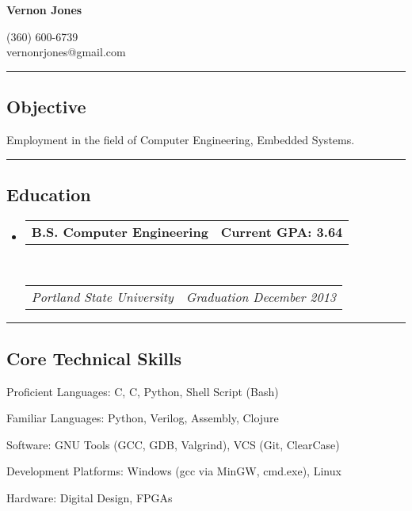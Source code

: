 \documentclass[10pt,letterpaper]{article}
\makeatletter
\newenvironment{indentsection}[1]%
{\begin{list}{}%
	{\setlength{\leftmargin}{#1}}%
	\item[]%
}
{\end{list}}
\newcommand{\headerrow}[2]
{\begin{tabular*}{\linewidth}{l@{\extracolsep{\fill}}r}
	#1 &
	#2 \\
\end{tabular*}}
\newcommand{\CPP}
{C\nolinebreak[4]\hspace{-.05em}\raisebox{.22ex}{\footnotesize\bf ++}}
\makeatother
\begin{document}
\begin{center}
{\LARGE \textbf{Vernon Jones}}

(360) 600-6739\\
vernonrjones@gmail.com
\end{center}

\hrule
\vspace{-0.4em}
\subsection*{Objective}
\begin{indentsection}{\parindent}
\begin{description*}
		\item Employment in the field of Computer Engineering, Embedded Systems.
\end{description*}
\end{indentsection}
\vspace{1em}

\hrule
\vspace{-0.4em}
\subsection*{Education}

\begin{itemize}
	\parskip=0.1em

	\item 
	\headerrow
                {\textbf{B.S. Computer Engineering}}
				{\textbf{Current GPA: 3.64}}
	\\
	\headerrow
		{\emph{Portland State University}}
		{\emph{Graduation December 2013}}
\end{itemize}
\vspace{1em}


\hrule
\vspace{-0.4em}
\subsection*{Core Technical Skills}

\begin{indentsection}{\parindent}
\begin{description*}
	\item[Proficient Languages:]
		C, \CPP, Python, Shell Script (Bash)
	\item[Familiar Languages:]
		Python, Verilog, Assembly, Clojure 
	\item[Software:]
    GNU Tools (GCC, GDB, Valgrind), VCS (Git, ClearCase)
	\item[Development Platforms:]
	Windows (gcc via MinGW, cmd.exe), Linux
	\item[Hardware:]
    Digital Design, FPGAs
\end{description*}
\end{indentsection}
\vspace{1em}
\end{document}
